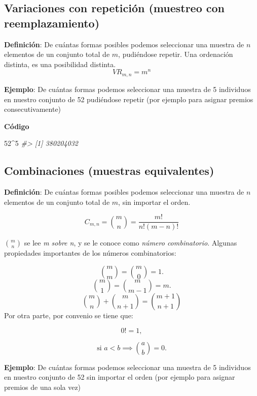 \documentclass[
]{book}
\newenvironment{Shaded}{\begin{snugshade}}{\end{snugshade}}
\newcommand{\CommentTok}[1]{\textcolor[rgb]{0.56,0.35,0.01}{\textit{#1}}}
\newcommand{\DecValTok}[1]{\textcolor[rgb]{0.00,0.00,0.81}{#1}}
\newcommand{\SpecialCharTok}[1]{\textcolor[rgb]{0.00,0.00,0.00}{#1}}
\begin{document}
\hypertarget{variaciones-con-repeticiuxf3n-muestreo-con-reemplazamiento}{%
\subsection{Variaciones con repetición (muestreo con reemplazamiento)}\label{variaciones-con-repeticiuxf3n-muestreo-con-reemplazamiento}}

\textbf{Definición}: De cuántas formas posibles podemos seleccionar
una muestra de \(n\) elementos de un conjunto total de \(m\), pudiéndose
repetir. Una ordenación distinta, es una posibilidad distinta.
\[\mathit{VR}_{m,n} = m^n\]

\textbf{Ejemplo}: De cuántas formas podemos seleccionar una muestra
de 5 individuos en nuestro conjunto de 52 pudiéndose repetir (por
ejemplo para asignar premios consecutivamente)

\textbf{Código}

\begin{Shaded}
\begin{Highlighting}[]
\DecValTok{52}\SpecialCharTok{\^{}}\DecValTok{5}
\CommentTok{\#\textgreater{} [1] 380204032}
\end{Highlighting}
\end{Shaded}

\hypertarget{combinaciones-muestras-equivalentes}{%
\subsection{Combinaciones (muestras equivalentes)}\label{combinaciones-muestras-equivalentes}}

\textbf{Definición}: De cuántas formas posibles podemos seleccionar
una muestra de \(n\) elementos de un conjunto total de \(m\), sin importar
el orden.

\[\mathit{C}_{m,n} = \binom{m}{n} = \frac{m!}{n!(m-n)!}\]

\(\binom{m}{n}\) se lee \emph{m sobre n}, y se le conoce como \emph{número combinatorio}.
Algunas propiedades importantes de los números combinatorios:

\[\binom{m}{m} = \binom{m}{0} = 1.\]
\[\binom{m}{1} = \binom{m}{m-1} = m.\]
\[\binom{m}{n} + \binom{m}{n+1} = \binom{m+1}{n+1}\]
Por otra parte, por convenio se tiene que:

\[0!=1,\]

\[\text{si } a <b \implies \binom{a}{b} = 0.\]

\textbf{Ejemplo}: De cuántas formas podemos seleccionar una muestra
de 5 individuos en nuestro conjunto de 52 sin importar el orden (por
ejemplo para asignar premios de una sola vez)
\end{document}
